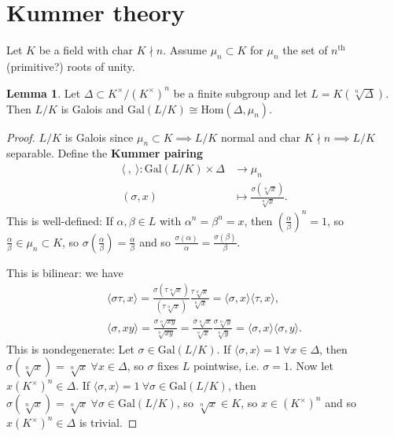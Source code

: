 \documentclass{article}
\theoremstyle{definition}
\newtheorem{lemma}[theorem]{Lemma}
\begin{document}
\section{Kummer theory}
Let $K$ be a field with $\text{char }K \nmid n$. Assume $\mu_n \subset K$ for $\mu_n$ the set of $n^{\text{th}}$ (primitive?) roots of unity.
\begin{lemma}\label{lemma11.1}
    Let $\Delta \subset K^\times/(K^\times)^n$ be a finite subgroup and let $L = K(\sqrt[n]{\Delta})$. Then $L/K$ is Galois and $\text{Gal}(L/K) \cong \text{Hom}(\Delta,\mu_n)$.
\end{lemma}
\begin{proof}
    $L/K$ is Galois since $\mu_n \subset K \implies L/K$ normal and $\text{char }K \nmid n \implies L/K$ separable. Define the \textbf{Kummer pairing} 
    \begin{align*}
        \langle ~,~ \rangle : \text{Gal}(L/K) \times \Delta &\to \mu_n \\
        (\sigma,x) &\mapsto \frac{\sigma(\sqrt[n]{x})}{\sqrt[n]{x}}.
    \end{align*}
    This is well-defined: If $\alpha,\beta \in L$ with $\alpha^n=\beta^n=x$, then $\left(\frac{\alpha}{\beta}\right)^n=1$, so $\frac{\alpha}{\beta} \in \mu_n \subset K$, so $\sigma \left(\frac{\alpha}{\beta}\right) = \frac{\alpha}{\beta}$ and so $\frac{\sigma(\alpha)}{\alpha} = \frac{\sigma(\beta)}{\beta}$.
    \vspace{1mm}
     
    This is bilinear: we have
    \begin{align*}
        \langle \sigma \tau, x \rangle = \frac{\sigma(\tau \sqrt[n]{x})}{(\tau \sqrt[n]{x})} \frac{\tau \sqrt[n]{x}}{\sqrt[n]{x}} = \langle \sigma,x \rangle \langle \tau, x \rangle,\\
        \langle \sigma,xy \rangle = \frac{\sigma \sqrt[n]{xy}}{\sqrt[n]{xy}} = \frac{\sigma \sqrt[n]{x}}{\sqrt[n]{x}}\frac{\sigma \sqrt[n]{y}}{\sqrt[n]{y}} = \langle \sigma,x \rangle \langle \sigma,y \rangle.
    \end{align*} 
    This is nondegenerate: Let $\sigma \in \text{Gal}(L/K)$. If $\langle \sigma,x \rangle = 1 ~\forall x \in \Delta$, then $\sigma(\sqrt[n]{x})=\sqrt[n]{x} ~\forall x \in \Delta$, so $\sigma$ fixes $L$ pointwise, i.e. $\sigma=1$. Now let $x(K^\times)^n \in \Delta$. If $\langle \sigma, x \rangle = 1~\forall \sigma \in \text{Gal}(L/K)$, then $\sigma(\sqrt[n]{x})=\sqrt[n]{x}~\forall \sigma \in \text{Gal}(L/K)$, so $\sqrt[n]{x} \in K$, so $x \in (K^\times)^n$ and so $x(K^{\times})^n \in \Delta$ is trivial.
    \vspace{1mm}
     

\end{proof}
\end{document}
